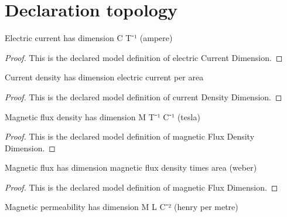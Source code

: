 \section{Declaration topology}
\begin{definition}
  \label{def:physics:phyx-mini-0975:phyxminiproblems-problemphyxmini0975-electriccurrentdimension}
  Electric current has dimension C T⁻¹ (ampere)
\end{definition}
\begin{proof}
  This is the declared model definition of electric Current Dimension.
\end{proof}
\begin{definition}
  \label{def:physics:phyx-mini-0975:phyxminiproblems-problemphyxmini0975-currentdensitydimension}
  Current density has dimension electric current per area
\end{definition}
\begin{proof}
  This is the declared model definition of current Density Dimension.
\end{proof}
\begin{definition}
  \label{def:physics:phyx-mini-0975:phyxminiproblems-problemphyxmini0975-magneticfluxdensitydimension}
  Magnetic flux density has dimension M T⁻¹ C⁻¹ (tesla)
\end{definition}
\begin{proof}
  This is the declared model definition of magnetic Flux Density Dimension.
\end{proof}
\begin{definition}
  \label{def:physics:phyx-mini-0975:phyxminiproblems-problemphyxmini0975-magneticfluxdimension}
  Magnetic flux has dimension magnetic flux density times area (weber)
\end{definition}
\begin{proof}
  This is the declared model definition of magnetic Flux Dimension.
\end{proof}
\begin{definition}
  \label{def:physics:phyx-mini-0975:phyxminiproblems-problemphyxmini0975-magneticpermeabilitydimension}
  Magnetic permeability has dimension M L C⁻² (henry per metre)
\end{definition}
